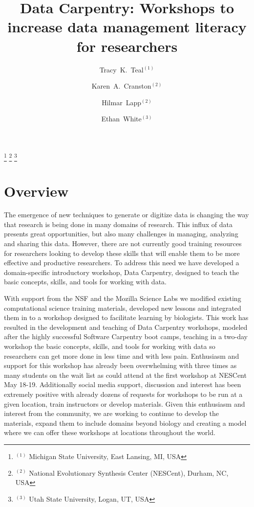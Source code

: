 \documentclass[11pt]{article}
\begin{document}
\title{Data Carpentry: Workshops to increase data management literacy for researchers}
\author{Tracy~K.~Teal$^{(1)}$ \and Karen~A.~Cranston$^{(2)}$ \and Hilmar~Lapp$^{(2)}$ \and Ethan~White$^{(3)}$}
\thanks{{}$^{(1)}$ Michigan State University, East Lansing, MI, USA}
\thanks{{}$^{(2)}$ National Evolutionary Synthesis Center (NESCent), Durham, NC, USA}
\thanks{{}$^{(3)}$ Utah State University, Logan, UT, USA}
\date{}

\maketitle

\section{Overview }
The emergence of new techniques to generate or digitize data is changing the way that research is being done in many domains of research. This influx of data presents great opportunities, but also many challenges in managing, analyzing and sharing this data. However, there are not currently good training resources for researchers looking to develop these skills that will enable them to be more effective and productive researchers. To address this need we have developed a domain-specific introductory workshop, Data Carpentry, designed to teach the basic concepts, skills, and tools for working with data. 

With support from the NSF and the Mozilla Science Labs we modified existing computational science training materials, developed new lessons and integrated them in to a workshop designed to facilitate learning by biologists. 
This work has resulted in the development and teaching of  Data Carpentry workshops, modeled after the highly successful Software Carpentry boot camps, teaching in a  two-day workshop the basic concepts, skills, and tools for working with data so researchers can get more done in less time and with less pain. Enthusiasm and support for this workshop has already been overwhelming with three times as many students on the wait list as could attend at the first workshop at NESCent May 18-19. Additionally social media support, discussion and interest has been extremely positive with already dozens of requests for workshops to be run at a given location, train instructors or develop materials. Given this enthusiasm and interest from the community, we are working to continue to develop the materials, expand them to include domains beyond biology and creating a model where we can offer these workshops at locations throughout the world.
\end{document}
